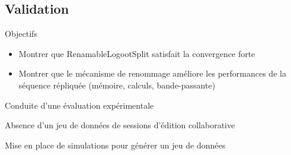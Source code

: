 \subsection{Validation}

\begin{frame}{Objectifs}
  \begin{itemize}
    \item \alert{Montrer que RenamableLogootSplit satisfait la convergence forte}
    \item \alert{Montrer que le mécanisme de renommage améliore les performances} de la séquence répliquée (mémoire, calculs, bande-passante)
  \end{itemize}
  \pause
  \begin{center}
    \alert{Conduite d'une évaluation expérimentale}
  \end{center}
\end{frame}

\begin{frame}[standout]
  \alert{Absence d'un jeu de données de sessions d'édition collaborative}

  \medskip
  \pause
  Mise en place de simulations pour générer un jeu de données
\end{frame}

